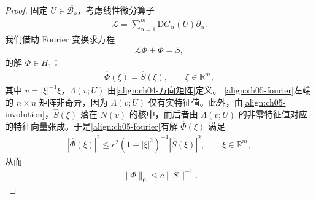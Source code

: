 \documentclass[../../main.tex]{subfiles}
\begin{document}
\begin{proof}
固定 $U\in\overline{\mathscr{B}_{\rho}}$，考虑线性微分算子
\begin{align}
\mathscr{L}=\sum_{\alpha=1}^{m}\mathrm{D}G_{\alpha}(U)\partial_{\alpha}.\label{align:ch05-L-def}
\end{align}
我们借助 Fourier 变换求方程
\begin{align}
\mathscr{L}\Phi+\Phi=S,\label{align:ch05-L-Phi}
\end{align}
的解 $\Phi\in H_{1}$：
\begin{align}
[i|\xi|\Lambda(v;U)+I]\hat{\Phi}(\xi)=\hat{S}(\xi),\qquad\xi\in\mathbb{R}^{m},\label{align:ch05-fourier}
\end{align}
其中 $v=|\xi|^{-1}\xi$，$\Lambda(v;U)$ 由\eqref{align:ch04-方向矩阵}定义。
\eqref{align:ch05-fourier}左端的 $n\times n$ 矩阵非奇异，因为 $\Lambda(v;U)$ 仅有实特征值。此外，由\eqref{align:ch05-involution}，$\hat{S}(\xi)$ 落在 $N(v)$ 的核中，而后者由 $\Lambda(v;U)$ 的非零特征值对应的特征向量张成。于是\eqref{align:ch05-fourier}有解 $\hat{\Phi}(\xi)$ 满足
\begin{align}
|\hat{\Phi}(\xi)|^{2}\leqslant c^{2}(1+|\xi|^{2})^{-1}|\hat{S}(\xi)|^{2},\qquad\xi\in\mathbb{R}^{m},\label{align:ch05-Phi-bound}
\end{align}
从而
\begin{align}
\|\Phi\|_{0}\leqslant c\|S\|^{-1}.\label{align:ch05-Phi-norm}
\end{align}


\end{proof}
\end{document}
